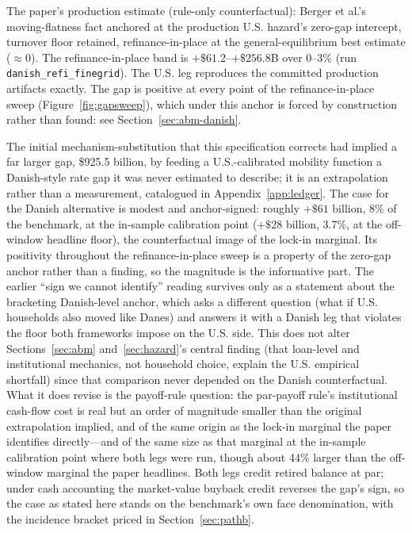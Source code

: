 \documentclass[12pt]{article}
\begin{document}
\begin{table}[H]
\begin{threeparttable}
\begin{tablenotes}[flushleft]
\item[d] The paper's production estimate (rule-only counterfactual): Berger et al.'s moving-flatness fact anchored at the production U.S. hazard's zero-gap intercept, turnover floor retained, refinance-in-place at the general-equilibrium best estimate ($\approx$0). The refinance-in-place band is $+\$61.2$--$+\$256.8$B over 0--3\% (run \texttt{danish\_refi\_finegrid}). The U.S. leg reproduces the committed production artifacts exactly. The gap is positive at every point of the refinance-in-place sweep (Figure~\ref{fig:gapsweep}), which under this anchor is forced by construction rather than found: see Section~\ref{sec:abm-danish}.
\end{tablenotes}
\end{threeparttable}
\end{table}

The initial mechanism-substitution that this specification corrects had implied a far larger gap, \$925.5 billion, by feeding a U.S.-calibrated mobility function a Danish-style rate gap it was never estimated to describe; it is an extrapolation rather than a measurement, catalogued in Appendix~\ref{app:ledger}. The case for the Danish alternative is modest and anchor-signed: roughly $+\$61$ billion, 8\% of the benchmark, at the in-sample calibration point ($+\$28$ billion, 3.7\%, at the off-window headline floor), the counterfactual image of the lock-in marginal. Its positivity throughout the refinance-in-place sweep is a property of the zero-gap anchor rather than a finding, so the magnitude is the informative part. The earlier ``sign we cannot identify'' reading survives only as a statement about the bracketing Danish-level anchor, which asks a different question (what if U.S. households also moved like Danes) and answers it with a Danish leg that violates the floor both frameworks impose on the U.S. side. This does not alter Sections~\ref{sec:abm} and~\ref{sec:hazard}'s central finding (that loan-level and institutional mechanics, not household choice, explain the U.S. empirical shortfall) since that comparison never depended on the Danish counterfactual. What it does revise is the payoff-rule question: the par-payoff rule's institutional cash-flow cost is real but an order of magnitude smaller than the original extrapolation implied, and of the same origin as the lock-in marginal the paper identifies directly---and of the same size as that marginal at the in-sample calibration point where both legs were run, though about 44\% larger than the off-window marginal the paper headlines. Both legs credit retired balance at par; under cash accounting the market-value buyback credit reverses the gap's sign, so the case as stated here stands on the benchmark's own face denomination, with the incidence bracket priced in Section~\ref{sec:pathb}.
\end{document}
